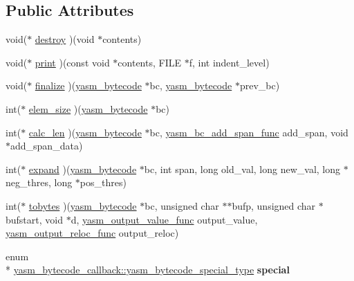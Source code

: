 \subsection*{Public Attributes}
\begin{DoxyCompactItemize}
\item 
void($\ast$ \hyperlink{structyasm__bytecode__callback_a4b1278cc8a4f20155552b794ab2fa7bf}{destroy} )(void $\ast$contents)
\item 
void($\ast$ \hyperlink{structyasm__bytecode__callback_a92d8048fa7a95b081f55411476709610}{print} )(const void $\ast$contents, F\-I\-L\-E $\ast$f, int indent\-\_\-level)
\item 
void($\ast$ \hyperlink{structyasm__bytecode__callback_a4cad5ebebb2abab4df507a2f8bc0e0a2}{finalize} )(\hyperlink{structyasm__bytecode}{yasm\-\_\-bytecode} $\ast$bc, \hyperlink{structyasm__bytecode}{yasm\-\_\-bytecode} $\ast$prev\-\_\-bc)
\item 
int($\ast$ \hyperlink{structyasm__bytecode__callback_a3fe73001c0b8ff617e801c2b7720d75a}{elem\-\_\-size} )(\hyperlink{structyasm__bytecode}{yasm\-\_\-bytecode} $\ast$bc)
\item 
int($\ast$ \hyperlink{structyasm__bytecode__callback_a8bf7bcf915f32d4e02a729a0ca5bd156}{calc\-\_\-len} )(\hyperlink{structyasm__bytecode}{yasm\-\_\-bytecode} $\ast$bc, \hyperlink{bytecode_8h_a911868d562d60ee4fdddc07c1799f8db}{yasm\-\_\-bc\-\_\-add\-\_\-span\-\_\-func} add\-\_\-span, void $\ast$add\-\_\-span\-\_\-data)
\item 
int($\ast$ \hyperlink{structyasm__bytecode__callback_a4763a7d0da44fef003397632b0051458}{expand} )(\hyperlink{structyasm__bytecode}{yasm\-\_\-bytecode} $\ast$bc, int span, long old\-\_\-val, long new\-\_\-val, long $\ast$neg\-\_\-thres, long $\ast$pos\-\_\-thres)
\item 
int($\ast$ \hyperlink{structyasm__bytecode__callback_af5ab5f920fece2d85ce2f7635844638e}{tobytes} )(\hyperlink{structyasm__bytecode}{yasm\-\_\-bytecode} $\ast$bc, unsigned char $\ast$$\ast$bufp, unsigned char $\ast$bufstart, void $\ast$d, \hyperlink{coretype_8h_aa826d76bab04c68a929446c75b8ddfe2}{yasm\-\_\-output\-\_\-value\-\_\-func} output\-\_\-value, \hyperlink{coretype_8h_a442d0350d9968d01d694bf35bbdd0e2f}{yasm\-\_\-output\-\_\-reloc\-\_\-func} output\-\_\-reloc)
\item 
\hypertarget{structyasm__bytecode__callback_a47445f04336e2dee9e494c86f482d5c4}{enum \\*
\hyperlink{structyasm__bytecode__callback_a872481e79c8510c5b8559f74599b4e20}{yasm\-\_\-bytecode\-\_\-callback\-::yasm\-\_\-bytecode\-\_\-special\-\_\-type} {\bfseries special}}\label{structyasm__bytecode__callback_a47445f04336e2dee9e494c86f482d5c4}

\end{DoxyCompactItemize}


